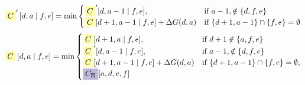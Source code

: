 \documentclass{article}
\begin{document}
$$ \colorbox{c1}{$C$}' \left[d,a \mid  f,e \right] =  \min\begin{cases}\colorbox{c1}{$C$}'[ d , a-1\mid f,e ], &\text{if } a-1 ,\notin\{ d , f,e \} \\\colorbox{c1}{$C$}[ d+1 , a-1\mid f,e ]+\Delta G(d,a) &\text{if } \{ d+1 , a-1 \}\cap \{ f,e \}=\emptyset\end{cases}$$
$$ \colorbox{c1}{$C$} \left[d,a \mid  f,e \right] =  \min\begin{cases}\colorbox{c1}{$C$}[ d+1 , a\mid f,e ], &\text{if } d+1 \notin\{ a , f,e \} \\\colorbox{c1}{$C$}'[ d , a-1\mid f,e ], &\text{if } a-1 ,\notin\{ d , f,e \} \\\colorbox{c1}{$C$}[ d+1 , a-1\mid f,e ]+\Delta G(d,a) &\text{if } \{ d+1 , a-1 \}\cap \{ f,e \}=\emptyset,\\\colorbox{c2}{$C_{\boxtimes}$}[a,d,e,f]\end{cases}$$
\end{document}
